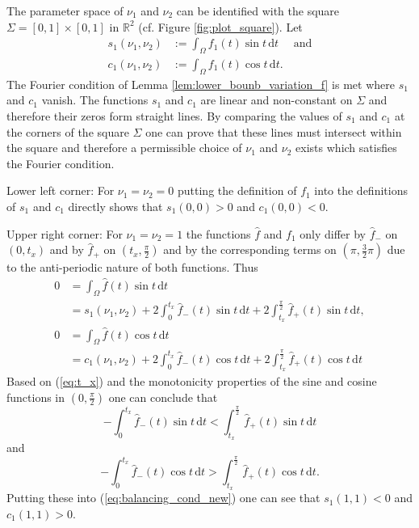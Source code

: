 \documentclass{article}
\newcommand{\dt}{\,\mathrm{d}t}
\newcommand{\R}{\mathbb{R}\xspace}
\begin{document}
The parameter space of $\nu_1$ and $\nu_2$ can be identified with the square $\Sigma =[0,1] \times [0,1]$ in $\R^2$ (cf. Figure \ref{fig:plot_square}). Let
\begin{equation}
    \begin{aligned}
        s_1(\nu_1, \nu_2) &:= \int_\Omega f_1(t) \sin t \dt \quad \text{ and} \\
        c_1(\nu_1, \nu_2) &:= \int_\Omega f_1(t) \cos t \dt.
    \end{aligned}
\end{equation}
The Fourier condition of Lemma \ref{lem:lower_bounb_variation_f} is met where $s_1$ and $c_1$ vanish. The functions $s_1$ and $c_1$ are linear and non-constant on $\Sigma$ and therefore their zeros form straight lines. By comparing the values of $s_1$ and $c_1$ at the corners of the square $\Sigma$ one can prove that these lines must intersect within the square and therefore a permissible choice of $\nu_1$ and $\nu_2$ exists which satisfies the Fourier condition.

Lower left corner: For $\nu_1 = \nu_2 = 0$ putting the definition of $f_1$ into the definitions of $s_1$ and $c_1$ directly shows that $s_1(0,0) > 0$ and $c_1(0,0) < 0$. %

Upper right corner: For $\nu_1 = \nu_2 = 1$ the functions $\hat f$ and $f_1$ only differ by $\hat f_-$ on $(0,t_x)$ and by $\hat f_+$ on $(t_x, \frac{\pi}{2})$ and by the corresponding terms on $(\pi, \frac 32 \pi)$ due to the anti-periodic nature of both functions. Thus
\begin{equation} \label{eq:balancing_cond_new}
    \begin{aligned}
        0 &= \int_\Omega\hat f(t) \sin t \dt  \\
        &= s_1(\nu_1,\nu_2) + 2\int_0^{t_x} \hat f_-(t) \sin t \dt + 2\int_{t_x}^{\frac\pi 2} \hat f_+(t) \sin t \dt, \\
        0 &= \int_\Omega\hat f(t) \cos t \dt \\
        &= c_1(\nu_1,\nu_2) + 2\int_0^{t_x} \hat f_-(t) \cos t \dt + 2\int_{t_x}^{\frac\pi 2} \hat f_+(t) \cos t \dt 
    \end{aligned}
\end{equation}
Based on (\ref{eq:t_x}) and the monotonicity properties of the sine and cosine functions in $(0, \frac{\pi}{2})$ one can conclude that
\begin{equation*}
    - \int_{0}^{t_x} \hat f_-(t) \sin t \dt < \int_{t_x}^{\frac\pi 2} \hat f_+(t) \sin t \dt
\end{equation*}
and
\begin{equation*}
    - \int_{0}^{t_x} \hat f_-(t) \cos t \dt > \int_{t_x}^{\frac\pi 2} \hat f_+(t) \cos t \dt.
\end{equation*}
Putting these into (\ref{eq:balancing_cond_new}) one can see that $s_1(1,1)<0$ and $c_1(1,1) > 0$.
\end{document}
